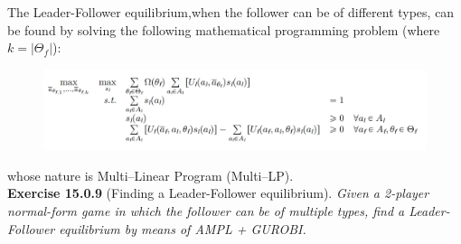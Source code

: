 The Leader-Follower equilibrium,when the follower can be of different types, can be found by solving the following mathematical programming problem (where $k = |\Theta_f|$):
\begin{figure}[H]
\centering
\includegraphics[width=\textwidth]{images/img_3_15_05.png}
\end{figure}
whose nature is Multi–Linear Program (Multi–LP).\\

\textbf{Exercise 15.0.9} (Finding a Leader-Follower equilibrium). \textit{Given a 2-player normal-form game in which the follower can be of multiple types, find a Leader-Follower equilibrium by means of AMPL + GUROBI.}\\
